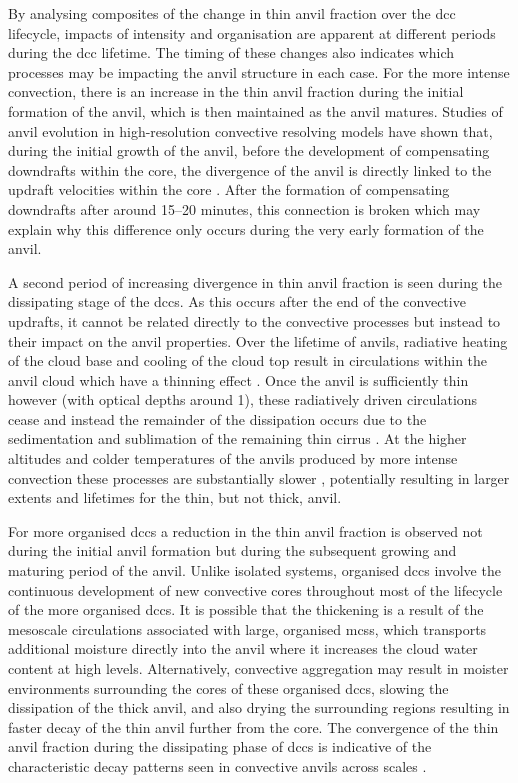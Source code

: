 By analysing composites of the change in thin anvil fraction over the \acrshort{dcc} lifecycle, impacts of intensity and organisation are apparent at different periods during the \acrshort{dcc} lifetime.
The timing of these changes also indicates which processes may be impacting the anvil structure in each case.
For the more intense convection, there is an increase in the thin anvil fraction during the initial formation of the anvil, which is then maintained as the anvil matures.
Studies of anvil evolution in high-resolution convective resolving models have shown that, during the initial growth of the anvil, before the development of compensating downdrafts within the core, the divergence of the anvil is directly linked to the updraft velocities within the core \citep{senf_highresolution_2018}.
After the formation of compensating downdrafts after around 15--20 minutes, this connection is broken which may explain why this difference only occurs during the very early formation of the anvil.

A second period of increasing divergence in thin anvil fraction is seen during the dissipating stage of the \acrshort{dcc}s.
As this occurs after the end of the convective updrafts, it cannot be related directly to the convective processes but instead to their impact on the anvil properties.
Over the lifetime of anvils, radiative heating of the cloud base and cooling of the cloud top result in circulations within the anvil cloud which have a thinning effect \citep{gasparini_what_2019}.
Once the anvil is sufficiently thin however (with optical depths around 1), these radiatively driven circulations cease and instead the remainder of the dissipation occurs due to the sedimentation and sublimation of the remaining thin cirrus \citep{sokol_tropical_2020}.
At the higher altitudes and colder temperatures of the anvils produced by more intense convection these processes are substantially slower \citep{seeley_formation_2019}, potentially resulting in larger extents and lifetimes for the thin, but not thick, anvil.

For more organised \acrshort{dcc}s a reduction in the thin anvil fraction is observed not during the initial anvil formation but during the subsequent growing and maturing period of the anvil.
Unlike isolated systems, organised \acrshort{dcc}s involve the continuous development of new convective cores throughout most of the lifecycle of the more organised \acrshort{dcc}s.
It is possible that the thickening is a result of the mesoscale circulations associated with large, organised \acrshort{mcs}s, which transports additional moisture directly into the anvil where it increases the cloud water content at high levels.  
Alternatively, convective aggregation may result in moister environments surrounding the cores of these organised \acrshort{dcc}s, slowing the dissipation of the thick anvil, and also drying the surrounding regions resulting in faster decay of the thin anvil further from the core.
The convergence of the thin anvil fraction during the dissipating phase of \acrshort{dcc}s is indicative of the characteristic decay patterns seen in convective anvils across scales \citep{roca_simple_2017, elsaesser_simple_2022}.

